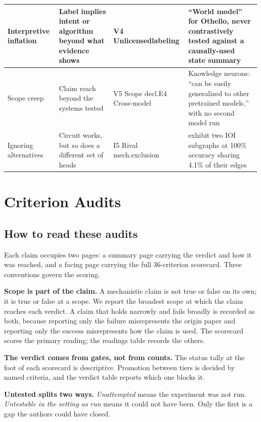 \documentclass{article}
\begin{document}
\begin{table}[H]
\begin{tabular}{@{}l>{\raggedright\arraybackslash}p{3.2cm}>{\raggedright\arraybackslash}p{2.6cm}>{\raggedright\arraybackslash}p{3.9cm}@{}}
\midrule
Interpretive inflation & Label implies intent or algorithm beyond what evidence shows & V4 Unlicensed\newline labeling & ``World model'' for Othello, never contrastively tested against a causally-used state summary \\
\midrule
Scope creep & Claim reach beyond the systems tested & V5 Scope decl.\newline E4 Cross-model & Knowledge neurons: ``can be easily generalized to other pretrained models,'' with no second model run \\
\midrule
Ignoring alternatives & Circuit works, but so does a different set of heads & I5 Rival mech.\newline exclusion & \citet{chen2026circuits} exhibit two IOI subgraphs at 100\% accuracy sharing 4.1\% of their edges \\
\bottomrule
\end{tabular}
\end{table}
\endgroup

\clearpage
\section{Criterion Audits}
\label{appendix:audits}

\subsection*{How to read these audits}

Each claim occupies two pages: a summary page carrying the verdict and how it was reached, and a facing
page carrying the full 36-criterion scorecard. Three conventions govern the scoring.

\textbf{Scope is part of the claim.} A mechanistic claim is not true or false on its own;
it is true or false at a scope. We report the broadest scope at which the claim reaches
each verdict. A claim that holds narrowly and fails broadly is recorded as both, because
reporting only the failure misrepresents the origin paper and reporting only the success
misrepresents how the claim is used. The scorecard scores the primary reading; the readings table records the others.

\textbf{The verdict comes from gates, not from counts.} The status tally at the foot of
each scorecard is descriptive. Promotion between tiers is decided by named criteria, and
the verdict table reports which one blocks it.

\textbf{Untested splits two ways.} \emph{Unattempted} means the experiment was not run.
\emph{Untestable in the setting as run} means it could not have been. Only the first is a
gap the authors could have closed.
\end{document}
